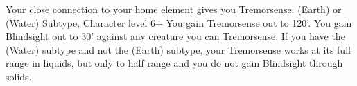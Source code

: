 \shortdescfeat
{Your close connection to your home element gives you Tremorsense.}
{(Earth) or (Water) Subtype, Character level 6+}
{You gain Tremorsense out to 120'.  You gain Blindsight out to 30' against any creature you can Tremorsense.  If you have the (Water) subtype and not the (Earth) subtype, your Tremorsense works at its full range in liquids, but only to half range and you do not gain Blindsight through solids.}


